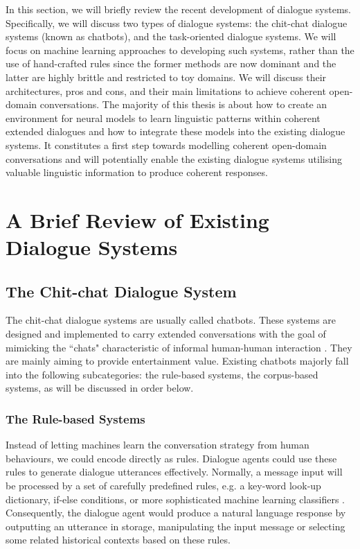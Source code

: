 \documentclass[bsc,frontabs,twoside,singlespacing,parskip,deptreport]{infthesis}     %
\begin{document}
In this section, we will briefly review the recent development of dialogue systems. Specifically, we will discuss two types of dialogue systems: the chit-chat dialogue systems (known as chatbots), and the task-oriented dialogue systems. We will focus on machine learning approaches to developing such systems, rather than the use of hand-crafted rules since the former methods are now dominant and the latter are highly brittle and restricted to toy domains. We will discuss their architectures, pros and cons, and their main limitations to achieve coherent open-domain conversations. The majority of this thesis is about how to create an environment for neural models to learn linguistic patterns within coherent extended dialogues and how to integrate these models into the existing dialogue systems. It constitutes a first step towards modelling coherent open-domain conversations and will potentially enable the existing dialogue systems utilising valuable linguistic information to produce coherent responses.

\section {A Brief Review of Existing Dialogue Systems}

\subsection{The Chit-chat Dialogue System}

The chit-chat dialogue systems are usually called chatbots. These systems are designed and implemented to carry extended conversations with the goal of mimicking the ``chats" characteristic of informal human-human interaction \cite{jurafsky2019speech}. They are mainly aiming to provide entertainment value. Existing chatbots majorly fall into the following subcategories: the rule-based systems, the corpus-based systems, as will be discussed in order below.

\subsubsection*{The Rule-based Systems}

Instead of letting machines learn the conversation strategy from human behaviours, we could encode directly as rules. Dialogue agents could use these rules to generate dialogue utterances effectively. Normally, a message input will be processed by a set of carefully predefined rules, e.g. a key-word look-up dictionary, if-else conditions, or more sophisticated machine learning classifiers \cite{jiweilithesis}. Consequently, the dialogue agent would produce a natural language response by outputting an utterance in storage, manipulating the input message or selecting some related historical contexts based on these rules.
\end{document}
